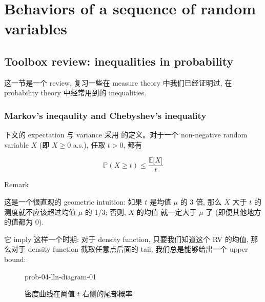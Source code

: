 \chapter{Behaviors of a sequence of random variables}\label{behaviors-of-a-sequence-of-random-variables}

\section{Toolbox review: inequalities in probability}\label{toolbox-review-inequalities-in-probability}

这一节是一个 review, 复习一些在 measure theory 中我们已经证明过, 在 probability theory 中经常用到的 inequalities.

\subsection{Markov's ineqaulity and Chebyshev's inequality}\label{markovs-ineqaulity-and-chebyshevs-inequality}

\begin{theorem}{}

下文的 expectation 与 variance 采用  的定义。对于一个 non-negative random variable \(\mathit{X}\) (即 \(\mathit{X} \geq 0\) a.s.), 任取 \(\mathit{t} > 0\), 都有

\[\mathbb{P}(\mathit{X} \geq \mathit{t}) \leq \frac{\mathbb{E}\lbrack\mathit{X}\rbrack}{\mathit{t}}\]

\end{theorem}

\begin{qlremark}{Remark}

这是一个很直观的 geometric intuition: 如果 \(\mathit{t}\) 是均值 \(\mathit{\mu}\) 的 3 倍, 那么 \(\mathit{X}\) 大于 \(\mathit{t}\) 的测度就不应该超过均值 \(\mathit{\mu}\) 的 1/3; 否则, \(\mathit{X}\) 的均值 就一定大于 \(\mathit{\mu}\) 了 (即便其他地方的值都为 0).

它 imply 这样一个时期: 对于 density function, 只要我们知道这个 RV 的均值, 那么对于 density function 截取任意点后面的 tail, 我们总是能够给出一个 upper bound:

\begin{figure}[htbp]
\centering
\begin{qldrawing}
\csname prob-04-lln-diagram-01\endcsname
\end{qldrawing}

\caption{密度曲线在阈值 \(\mathit{t}\) 右侧的尾部概率}

\label{fig-prob-04-lln-diagram-01}

\end{figure}

\end{qlremark}

